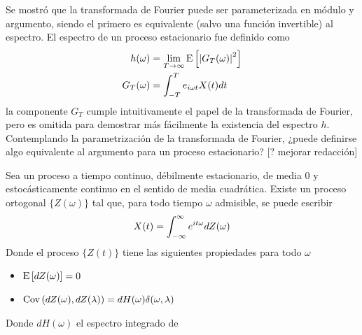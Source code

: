 Se mostró que la transformada de Fourier puede ser parameterizada en módulo y argumento, siendo el primero es equivalente (salvo una función invertible) al espectro.
%
El espectro de un proceso estacionario fue definido como
\begin{align*}
h(\omega) &= \lim_{T\rightarrow\infty} \mathrm{E}\left[ \left|  G_T(\omega) \right|^{2} \right] \\
G_T(\omega) &= \int_{-T}^{T} e_{i \omega t} X(t) dt
\end{align*}
la componente $G_T$ cumple intuitivamente el papel de la transformada de Fourier, pero es omitida para demostrar más fácilmente la existencia del espectro $h$. Contemplando la parametrización de la transformada de Fourier, ¿puede definirse algo equivalente al argumento para un proceso estacionario?
%
[? mejorar redacción]

\begin{teorema}
Sea \xt un proceso a tiempo continuo, débilmente estacionario, de media 0 y estocásticamente continuo en el sentido de media cuadrática. Existe un proceso ortogonal $\{Z(\omega)\}$ tal que, para todo tiempo $\omega$ admisible, se puede escribir
\begin{equation*}
X(t) = \int_{-\infty}^{\infty} e^{i t \omega} dZ(\omega)
\end{equation*}
Donde el proceso $\{Z(t)\}$ tiene las siguientes propiedades para todo $\omega$
\begin{itemize}
\item $\mathrm{E}\left[ dZ(\omega) \right] = 0$
\item $\mathrm{Cov}\left( dZ(\omega),dZ(\lambda) \right) = dH(\omega) \delta(\omega, \lambda)$
\end{itemize}
Donde $dH(\omega)$ el espectro integrado de \xt
\label{rep_espectral}
\end{teorema}

